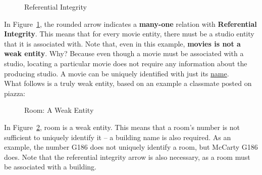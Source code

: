 \documentclass{article}
\begin{document}
\begin{figure}[H]
  \centering
  \caption{Referential Integrity}
  \label{weak-ref2}
\end{figure}
In Figure~\ref{weak-ref2}, the rounded arrow indicates a \textbf{many-one}
relation with \textbf{Referential Integrity}. This means that for every movie
entity, there must be a studio entity that it is associated with. Note that,
even in this example, \textbf{movies is not a weak entity}. Why? Because even
though a movie must be associated with a studio, locating a particular movie
does not require any information about the producing studio. A movie can be
uniquely identified with just its \underline{name}.\\
What follows is a truly weak entity, based on an example a classmate posted on
piazza:

\begin{figure}[H]
  \centering
  \caption{Room: A Weak Entity}
  \label{weak-ref3}
\end{figure}
In Figure~\ref{weak-ref3}, room is a weak entity. This means that a room's
number is not sufficient to uniquely identify it -- a building name is also
required. As an example, the number G186 does not uniquely identify a room, but
McCarty G186 does. Note that the referential integrity arrow is also necessary,
as a room must be associated with a building.
\end{document}
